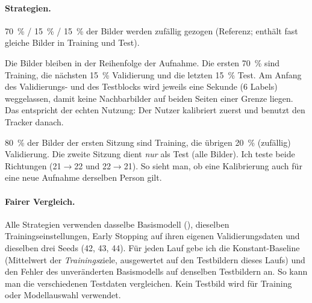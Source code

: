 \paragraph{Strategien.}
\begin{description}[nosep]
  \item[Zufällig] \SI{70}{\percent} /
        \SI{15}{\percent} / \SI{15}{\percent} der Bilder werden zufällig
        gezogen (Referenz; enthält fast gleiche Bilder in Training und Test).
  \item[Sequenziell] Die Bilder bleiben in der
        Reihenfolge der Aufnahme. Die ersten \SI{70}{\percent} sind Training,
        die nächsten \SI{15}{\percent} Validierung und die letzten
        \SI{15}{\percent} Test. Am Anfang des Validierungs- und des Testblocks
        wird jeweils eine Sekunde (6 Labels) weggelassen, damit keine
        Nachbarbilder auf beiden Seiten einer Grenze liegen. Das entspricht der
        echten Nutzung: Der Nutzer kalibriert zuerst und benutzt den Tracker
        danach.
  \item[Zwei Videos] \SI{80}{\percent} der
        Bilder der ersten Sitzung sind Training, die übrigen \SI{20}{\percent}
        (zufällig) Validierung. Die zweite Sitzung dient \emph{nur} als Test
        (alle Bilder). Ich teste beide Richtungen (21$\to$22 und 22$\to$21).
        So sieht man, ob eine Kalibrierung auch für eine neue Aufnahme
        derselben Person gilt.
\end{description}

\paragraph{Fairer Vergleich.} Alle Strategien verwenden dasselbe Basismodell
(), dieselben Trainingseinstellungen, Early Stopping auf
ihren eigenen Validierungsdaten und dieselben drei Seeds (42, 43, 44). Für
jeden Lauf gebe ich die Konstant-Baseline (Mittelwert der
\emph{Trainings}ziele, ausgewertet auf den Testbildern dieses Laufs) und den
Fehler des unveränderten Basismodells auf denselben Testbildern an. So kann man
die verschiedenen Testdaten vergleichen. Kein Testbild wird für Training oder
Modellauswahl verwendet.

